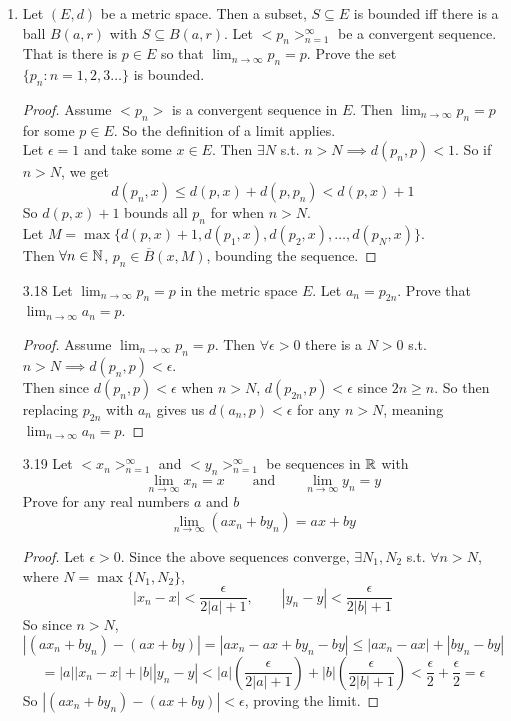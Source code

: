 \documentclass[14pt]{extarticle}
\begin{document}
\begin{enumerate}
		\item Let $(E,d)$ be a metric space. Then a subset, $S \subseteq E$ is bounded iff there is a ball $B(a,r)$ with $S \subseteq B(a,r)$. Let $<p_n>_{n=1}^\infty$ be a convergent sequence. That is there is $p \in E$ so that $\lim_{n\rightarrow\infty} p_n = p$. Prove the set $\{p_n : n =1,2,3\ldots\}$ is bounded.
		\begin{proof}
			Assume $<p_n>$ is a convergent sequence in $E$. Then $\lim_{n\rightarrow\infty} p_n = p$ for some $p \in E$. So the definition of a limit applies.\\
			Let $\epsilon = 1$ and take some $x \in E$. Then $\exists N$ s.t. $n > N \implies d(p_n,p) < 1$. So if $n > N$, we get
			\[d(p_n,x) \leq d(p,x) + d(p,p_n) < d(p,x) + 1\]
			So $d(p,x) + 1$ bounds all $p_n$ for when $n>N$.\\
			Let $M = \max\{d(p,x) + 1,d(p_1,x),d(p_2,x),\ldots,d(p_N,x)\}$.\\ Then $\forall n\in\mathbb{N}$, $p_n \in \overline{B}(x,M)$, bounding the sequence.
		\end{proof}
		
		\item[3.18] Let $\lim_{n\rightarrow\infty} p_n = p$ in the metric space $E$. Let $a_n = p_{2n}$. Prove that $\lim_{n\rightarrow\infty} a_n = p$.
		\begin{proof}
			Assume $\lim_{n\rightarrow\infty} p_n = p$. Then $\forall \epsilon>0$ there is a $N>0$ s.t. $n>N \implies d(p_n,p)<\epsilon$.\\
			Then since $d(p_n,p)< \epsilon$ when $n > N$, $d(p_{2n},p) < \epsilon$ since $2n \geq n$. So then replacing $p_{2n}$ with $a_n$ gives us $d(a_n,p) < \epsilon$ for any $n > N$, meaning $\lim_{n\rightarrow\infty} a_n = p$.
		\end{proof}
		
		\item[3.19] Let $<x_n>_{n=1}^\infty$ and $<y_n>_{n=1}^\infty$ be sequences in $\mathbb{R}$ with 
		\[\lim_{n\rightarrow\infty} x_n = x \qquad \text{and} \qquad \lim_{n\rightarrow\infty} y_n = y\]
		Prove for any real numbers $a$ and $b$
		\[\lim_{n\rightarrow\infty} (ax_n + by_n) = ax + by\]
		\begin{proof}
			Let $\epsilon>0$. Since the above sequences converge, $\exists N_1,N_2$ s.t. $\forall n > N$, where $N = \max\{N_1,N_2\}$,
			\[|x_n-x| < \frac{\epsilon}{2|a|+1},\qquad |y_n-y| < \frac{\epsilon}{2|b|+1}\]
			So since $n>N$,
			\[|(ax_n + by_n) - (ax + by)| = |ax_n - ax + by_n - by|\leq|ax_n - ax| + |by_n - by|\]
			\[= |a||x_n - x| + |b||y_n-y| < |a|\left(\frac{\epsilon}{2|a|+1}\right) + |b|\left(\frac{\epsilon}{2|b|+1}\right) < \frac{\epsilon}{2} + \frac{\epsilon}{2} = \epsilon\]
			So $|(ax_n + by_n) - (ax + by)|<\epsilon$, proving the limit.
		\end{proof}
		

\end{enumerate}
\end{document}
